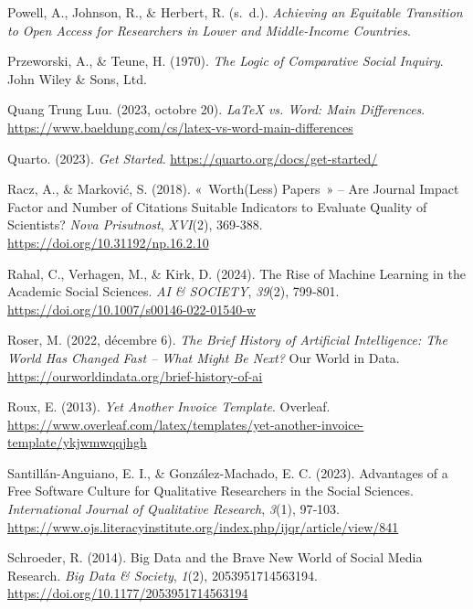 \documentclass[
  letterpaper,
  DIV=11,
  numbers=noendperiod,
  oneside]{scrreprt}
\newlength{\cslhangindent}
\newlength{\cslentryspacingunit} %
\newenvironment{CSLReferences}[2] %
 {%
  \setlength{\parindent}{0pt}
  \ifodd #1
  \let\oldpar\par
  \def\par{\hangindent=\cslhangindent\oldpar}
  \fi
  \setlength{\parskip}{#2\cslentryspacingunit}
 }%
 {}
\begin{document}
\begin{CSLReferences}{1}{0}
\leavevmode{}%
Powell, A., Johnson, R., \& Herbert, R. (s.~d.). \emph{Achieving an
{Equitable Transition} to {Open Access} for {Researchers} in {Lower} and
{Middle-Income Countries}}.

\leavevmode{}%
Przeworski, A., \& Teune, H. (1970). \emph{The Logic of Comparative
Social Inquiry}. John Wiley \& Sons, Ltd.

\leavevmode{}%
Quang Trung Luu. (2023, octobre 20). \emph{{LaTeX} vs. {Word}: {Main
Differences}}.
\url{https://www.baeldung.com/cs/latex-vs-word-main-differences}

\leavevmode{}%
Quarto. (2023). \emph{Get {Started}}.
\url{https://quarto.org/docs/get-started/}

\leavevmode{}%
Racz, A., \& Marković, S. (2018). {«~{Worth}(Less) Papers~»} -- Are
Journal Impact Factor and Number of Citations Suitable Indicators to
Evaluate Quality of Scientists? \emph{Nova Prisutnost}, \emph{XVI}(2),
369‑388. \url{https://doi.org/10.31192/np.16.2.10}

\leavevmode{}%
Rahal, C., Verhagen, M., \& Kirk, D. (2024). The Rise of Machine
Learning in the Academic Social Sciences. \emph{AI \& SOCIETY},
\emph{39}(2), 799‑801. \url{https://doi.org/10.1007/s00146-022-01540-w}

\leavevmode{}%
Roser, M. (2022, décembre 6). \emph{The {Brief History} of {Artificial
Intelligence}: {The World Has Changed Fast} -- {What Might Be Next}?}
Our World in Data. \url{https://ourworldindata.org/brief-history-of-ai}

\leavevmode{}%
Roux, E. (2013). \emph{Yet {Another Invoice Template}}. Overleaf.
\url{https://www.overleaf.com/latex/templates/yet-another-invoice-template/ykjwmwqqjhgh}

\leavevmode{}%
Santillán-Anguiano, E. I., \& González-Machado, E. C. (2023). Advantages
of a {Free Software Culture} for {Qualitative Researchers} in the
{Social Sciences}. \emph{International Journal of Qualitative Research},
\emph{3}(1), 97‑103.
\url{https://www.ojs.literacyinstitute.org/index.php/ijqr/article/view/841}

\leavevmode{}%
Schroeder, R. (2014). Big {Data} and the Brave New World of Social Media
Research. \emph{Big Data \& Society}, \emph{1}(2), 2053951714563194.
\url{https://doi.org/10.1177/2053951714563194}


\end{CSLReferences}
\end{document}
